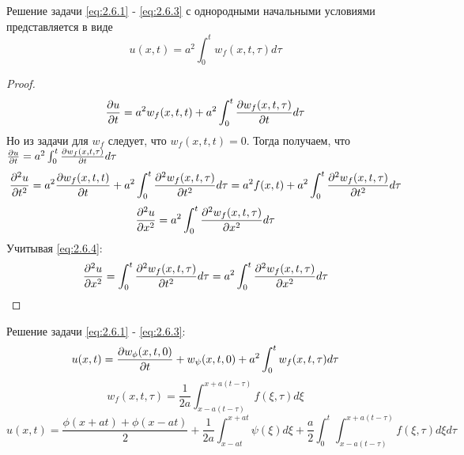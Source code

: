 \documentclass[../main.tex]{subfiles}
\begin{document}
\begin{theorem}
	Решение задачи  \eqref{eq:2.6.1} -  \eqref{eq:2.6.3} с однородными начальными условиями представляется в виде
	\begin{equation}
		u(x, t) = a^2\int_0^tw_f(x, t, \tau)d\tau
	\end{equation}
\end{theorem}
\begin{proof}
	$$
		\frac{\partial u}{\partial t}=a^2w_f(x, t, t) + a^2 \int_0^t\frac{\partial w_f(x,t,\tau)}{\partial t}d\tau
	$$
	Но из задачи для $w_f$ следует, что $w_f(x, t, t) = 0$. Тогда получаем, что
	$ \frac{\partial u}{\partial t} = a^2\int_0^t\frac{\partial w_f(x, t, \tau)}{\partial t}d\tau$
	$$
		\frac{\partial ^2u}{\partial t^2}=a^2\frac{\partial w_f(x, t, t)}{\partial t} + a^2\int_0^t\frac{\partial ^2w_f(x, t, \tau)}{\partial t^2}d\tau =
		a^2f(x, t) + a^2\int_0^t\frac{\partial ^2w_f(x, t, \tau)}{\partial t^2}d\tau
	$$
	$$
		\frac{\partial ^2u}{\partial x^2} = a^2\int_0^t\frac{\partial ^2w_f(x, t, \tau)}{\partial x^2}d\tau
	$$
	Учитывая \eqref{eq:2.6.4}:
	$$
		\frac{\partial ^2u}{\partial x^2} = \int_0^t\frac{\partial ^2w_f(x, t, \tau)}{\partial t^2}d\tau =  a^2\int_0^t\frac{\partial ^2w_f(x, t, \tau)}{\partial x^2}d\tau
	$$

\end{proof}
Решение задачи \eqref{eq:2.6.1} - \eqref{eq:2.6.3}:
$$
	u(x, t) = \frac{\partial w_\phi(x, t, 0)}{\partial t} + w_\psi(x, t, 0) + a^2\int_0^tw_f(x, t, \tau)d\tau
$$
$$
	w_f(x, t, \tau)=\frac{1}{2a}\int_{x - a(t-\tau)}^{x+a(t-\tau)}f(\xi, \tau)d\xi
$$
$$
	u(x, t) = \frac{\phi(x + at) + \phi(x - at)}{2} + \frac{1}{2a}\int_{x - at}^{x + at}\psi(\xi)d\xi + \frac{a}{2}\int_0^{t}\int_{x - a(t - \tau)}^{x + a(t - \tau)}f(\xi,\tau)d\xi d\tau
$$
\end{document}

